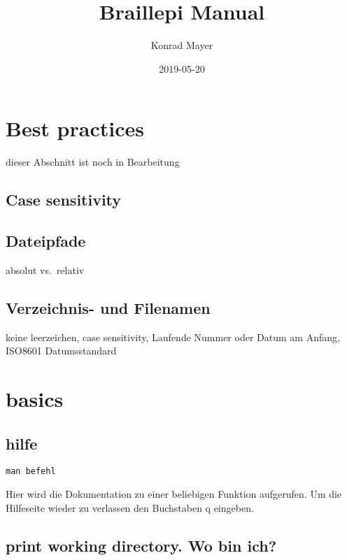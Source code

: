 \documentclass[]{book}
\title{Braillepi Manual}
\author{Konrad Mayer}
\date{2019-05-20}
\begin{document}
\maketitle

{
\setcounter{tocdepth}{1}
\tableofcontents
}
\hypertarget{best-practices}{%
\chapter{Best practices}\label{best-practices}}

dieser Abschnitt ist noch in Bearbeitung

\hypertarget{case-sensitivity}{%
\section{Case sensitivity}\label{case-sensitivity}}

\hypertarget{dateipfade}{%
\section{Dateipfade}\label{dateipfade}}

absolut vs.~relativ

\hypertarget{verzeichnis--und-filenamen}{%
\section{Verzeichnis- und Filenamen}\label{verzeichnis--und-filenamen}}

keine leerzeichen, case sensitivity, Laufende Nummer oder Datum am Anfang, ISO8601 Datumsstandard

\hypertarget{basics}{%
\chapter{basics}\label{basics}}

\hypertarget{hilfe}{%
\section{hilfe}\label{hilfe}}

\begin{verbatim}
man befehl
\end{verbatim}

Hier wird die Dokumentation zu einer beliebigen Funktion aufgerufen.
Um die Hilfeseite wieder zu verlassen den Buchstaben q eingeben.

\hypertarget{print-working-directory.-wo-bin-ich}{%
\section{print working directory. Wo bin ich?}\label{print-working-directory.-wo-bin-ich}}
\end{document}
